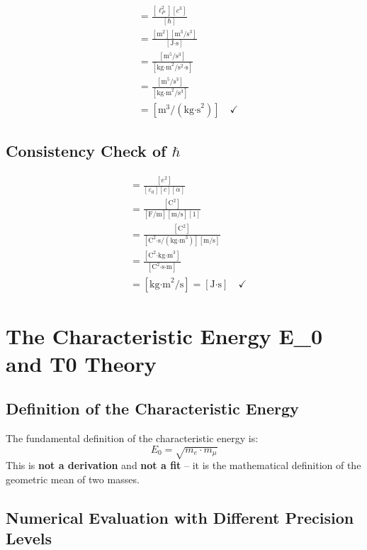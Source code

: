 	\begin{align}
		[G] &= \frac{[\ell_P^2][c^3]}{[\hbar]}\\
		&= \frac{[\text{m}^2][\text{m}^3/\text{s}^3]}{[\text{J·s}]}\\
		&= \frac{[\text{m}^5/\text{s}^3]}{[\text{kg·m}^2/\text{s}^2\text{·s}]}\\
		&= \frac{[\text{m}^5/\text{s}^3]}{[\text{kg·m}^2/\text{s}^3]}\\
		&= [\text{m}^3/(\text{kg·s}^2)] \quad \checkmark
	\end{align}
	
	\subsection{Consistency Check of $\hbar$}
	
	\begin{align}
		[\hbar] &= \frac{[e^2]}{[\varepsilon_0][c][\alpha]}\\
		&= \frac{[\text{C}^2]}{[\text{F/m}][\text{m/s}][1]}\\
		&= \frac{[\text{C}^2]}{[\text{C}^2\text{·s}/(\text{kg·m}^3)][\text{m/s}]}\\
		&= \frac{[\text{C}^2\text{·kg·m}^3]}{[\text{C}^2\text{·s·m}]}\\
		&= [\text{kg·m}^2/\text{s}] = [\text{J·s}] \quad \checkmark
	\end{align}
	
	\section{The Characteristic Energy E\_0 and T0 Theory}
	
	\subsection{Definition of the Characteristic Energy}
	
	\begin{tcolorbox}[colback=blue!5!white,colframe=blue!75!black,title=Basic Definition]
		The fundamental definition of the characteristic energy is:
		\begin{equation}
			\boxed{E_0 = \sqrt{m_e \cdot m_\mu}}
		\end{equation}
		This is \textbf{not a derivation} and \textbf{not a fit} -- it is the mathematical definition of the geometric mean of two masses.
	\end{tcolorbox}
	
	\subsection{Numerical Evaluation with Different Precision Levels}
	
